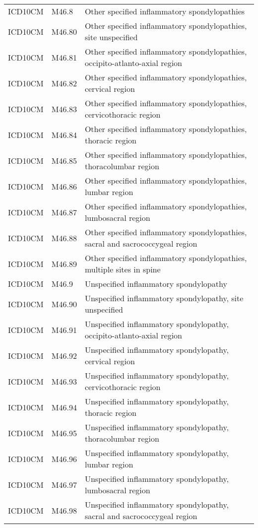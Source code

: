 \begin{longtable}{p{}p{}p{}}
  ICD10CM & M46.8 & Other specified inflammatory spondylopathies \\ 
  ICD10CM & M46.80 & Other specified inflammatory spondylopathies, site unspecified \\ 
  ICD10CM & M46.81 & Other specified inflammatory spondylopathies, occipito-atlanto-axial region \\ 
  ICD10CM & M46.82 & Other specified inflammatory spondylopathies, cervical region \\ 
  ICD10CM & M46.83 & Other specified inflammatory spondylopathies, cervicothoracic region \\ 
  ICD10CM & M46.84 & Other specified inflammatory spondylopathies, thoracic region \\ 
  ICD10CM & M46.85 & Other specified inflammatory spondylopathies, thoracolumbar region \\ 
  ICD10CM & M46.86 & Other specified inflammatory spondylopathies, lumbar region \\ 
  ICD10CM & M46.87 & Other specified inflammatory spondylopathies, lumbosacral region \\ 
  ICD10CM & M46.88 & Other specified inflammatory spondylopathies, sacral and sacrococcygeal region \\ 
  ICD10CM & M46.89 & Other specified inflammatory spondylopathies, multiple sites in spine \\ 
  ICD10CM & M46.9 & Unspecified inflammatory spondylopathy \\ 
  ICD10CM & M46.90 & Unspecified inflammatory spondylopathy, site unspecified \\ 
  ICD10CM & M46.91 & Unspecified inflammatory spondylopathy, occipito-atlanto-axial region \\ 
  ICD10CM & M46.92 & Unspecified inflammatory spondylopathy, cervical region \\ 
  ICD10CM & M46.93 & Unspecified inflammatory spondylopathy, cervicothoracic region \\ 
  ICD10CM & M46.94 & Unspecified inflammatory spondylopathy, thoracic region \\ 
  ICD10CM & M46.95 & Unspecified inflammatory spondylopathy, thoracolumbar region \\ 
  ICD10CM & M46.96 & Unspecified inflammatory spondylopathy, lumbar region \\ 
  ICD10CM & M46.97 & Unspecified inflammatory spondylopathy, lumbosacral region \\ 
  ICD10CM & M46.98 & Unspecified inflammatory spondylopathy, sacral and sacrococcygeal region \\ 

\end{longtable}
